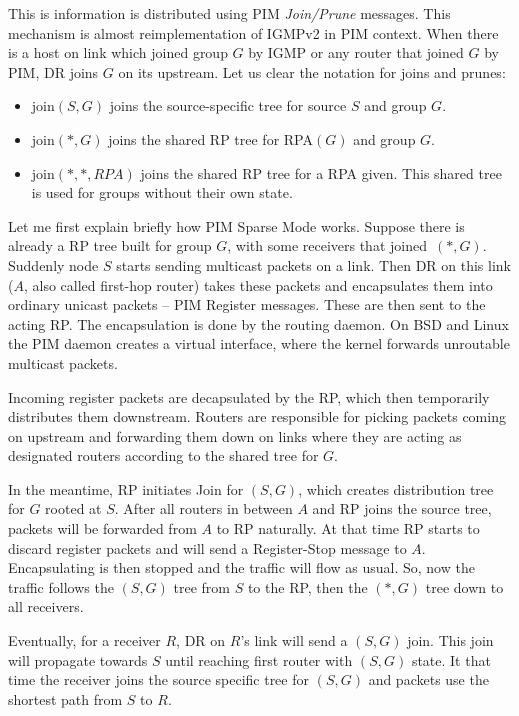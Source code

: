 This is information is distributed using PIM \emph{Join/Prune} messages. This
mechanism is almost reimplementation of IGMPv2 in PIM context. When there is
a host on link which joined group $G$ by IGMP or any router that joined $G$ by
PIM, DR joins $G$ on its upstream. Let us clear the notation for joins and prunes:

\begin{itemize}
  \item join$(S, G)$ joins the source-specific tree for source $S$ and group $G$.
  \item join$(*, G)$ joins the shared RP tree for RPA$(G)$ and group $G$.
  \item join$(*, *, RPA)$ joins the shared RP tree for a RPA given. This shared
    tree is used for groups without their own state.
\end{itemize}


Let me first explain briefly how PIM Sparse Mode works. Suppose there is
already a RP tree built for group $G$, with some receivers that joined~$(*,G)$.
Suddenly node $S$ starts sending multicast packets on a link. Then DR on
this link ($A$, also called first-hop router) takes these packets and
encapsulates them into ordinary unicast packets -- PIM Register messages. These
are then sent to the acting RP. The encapsulation is done by the routing
daemon. On BSD and Linux the PIM daemon creates a virtual interface, where the
kernel forwards unroutable multicast packets.

Incoming register packets are decapsulated by the RP, which then temporarily
distributes them downstream. Routers are responsible for picking packets coming
on upstream and forwarding them down on links where they are acting as
designated routers according to the shared tree for $G$.

In the meantime, RP initiates Join for $(S, G)$, which creates distribution
tree for $G$ rooted at $S$. After all routers in between $A$ and RP joins the
source tree, packets will be forwarded from $A$ to RP naturally. At that time
RP starts to discard register packets and will send a Register-Stop message to
$A$. Encapsulating is then stopped and the traffic will flow as usual. So, now
the traffic follows the $(S,G)$ tree from $S$ to the RP, then the $(*,G)$ tree
down to all receivers.


Eventually, for a receiver $R$, DR on $R$'s link will send a $(S, G)$ join.
This join will propagate towards $S$ until reaching first router with $(S,G)$
state. It that time the receiver joins the source specific tree for $(S,G)$ and
packets use the shortest path from $S$ to $R$.

